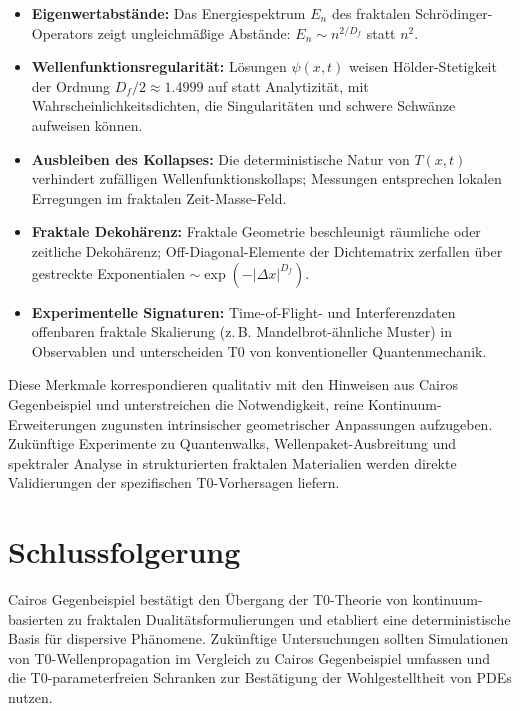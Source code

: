 	\begin{itemize}
		\item \textbf{Eigenwertabstände:} Das Energiespektrum $E_n$ des fraktalen Schrödinger-Operators zeigt ungleichmäßige Abstände: $E_n \sim n^{2/D_f}$ statt $n^2$.
		\item \textbf{Wellenfunktionsregularität:} Lösungen $\psi(x,t)$ weisen Hölder-Stetigkeit der Ordnung $D_f/2 \approx 1.4999$ auf statt Analytizität, mit Wahrscheinlichkeitsdichten, die Singularitäten und schwere Schwänze aufweisen können.
		\item \textbf{Ausbleiben des Kollapses:} Die deterministische Natur von $T(x,t)$ verhindert zufälligen Wellenfunktionskollaps; Messungen entsprechen lokalen Erregungen im fraktalen Zeit-Masse-Feld.
		\item \textbf{Fraktale Dekohärenz:} Fraktale Geometrie beschleunigt räumliche oder zeitliche Dekohärenz; Off-Diagonal-Elemente der Dichtematrix zerfallen über gestreckte Exponentialen $\sim \exp(-|\Delta x|^{D_f})$.
		\item \textbf{Experimentelle Signaturen:} Time-of-Flight- und Interferenzdaten offenbaren fraktale Skalierung (z.\,B. Mandelbrot-ähnliche Muster) in Observablen und unterscheiden T0 von konventioneller Quantenmechanik.
	\end{itemize}
	
	Diese Merkmale korrespondieren qualitativ mit den Hinweisen aus Cairos Gegenbeispiel und unterstreichen die Notwendigkeit, reine Kontinuum-Erweiterungen zugunsten intrinsischer geometrischer Anpassungen aufzugeben. Zukünftige Experimente zu Quantenwalks, Wellenpaket-Ausbreitung und spektraler Analyse in strukturierten fraktalen Materialien werden direkte Validierungen der spezifischen T0-Vorhersagen liefern.
	
	\section{Schlussfolgerung}
	
	Cairos Gegenbeispiel bestätigt den Übergang der T0-Theorie von kontinuum-basierten zu fraktalen Dualitätsformulierungen und etabliert eine deterministische Basis für dispersive Phänomene. Zukünftige Untersuchungen sollten Simulationen von T0-Wellenpropagation im Vergleich zu Cairos Gegenbeispiel umfassen und die T0-parameterfreien Schranken zur Bestätigung der Wohlgestelltheit von PDEs nutzen.
	
	

